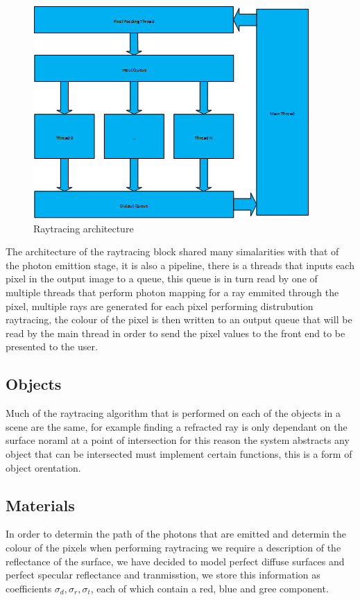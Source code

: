 \begin{figure}
\centering
\includegraphics{./images/pixel_threading.png}
\caption{Raytracing architecture}
\label{fig:pixel_generation}
\end{figure}

The architecture of the raytracing block shared many simalarities with that of the photon emittion stage,
it is also a pipeline, there is a threads that inputs each pixel in the output image to a queue, this queue
is in turn read by one of multiple threads that perform photon mapping for a ray emmited through the pixel,
multiple rays are generated for each pixel performing distrubution raytracing, the colour of the pixel is
then written to an output queue that will be read by the main thread in order to send the pixel values to
the front end to be presented to the user.

\subsection{Objects}
Much of the raytracing algorithm that is performed on each of the
objects in a scene are the same, for example finding a refracted
ray is only dependant on the surface noraml at a point of intersection
for this reason the system abstracts any object that can be intersected
must implement certain functions, this is a form of object orentation.

\subsection{Materials}
In order to determin the path of the photons that are emitted and determin the colour of the pixels when
performing raytracing we require a description of the reflectance of the surface, we have decided to model
perfect diffuse surfaces and perfect specular reflectance and tranmisstion, we store this information
as coefficients $\sigma_d, \sigma_r, \sigma_t$, each of which contain a red, blue and gree component.

